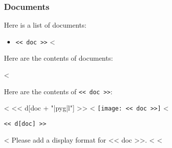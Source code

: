 \documentclass[12pt]{article}
\begin{document}
\subsubsection*{Documents}

Here is a list of documents:

\begin{itemize}
<%
\item{\verb|<< doc >>|}
<%
\end{itemize}

Here are the contents of documents:

<%

Here are the contents of \verb|<< doc >>|:

<%
<< d[doc + "|pyg|l"] >>
<%
\texttt{[image: << doc >>]}
<%
\begin{Verbatim}
<< d[doc] >>
\end{Verbatim}
<%
Please add a display format for << doc >>.
<%
<%
\end{document}
